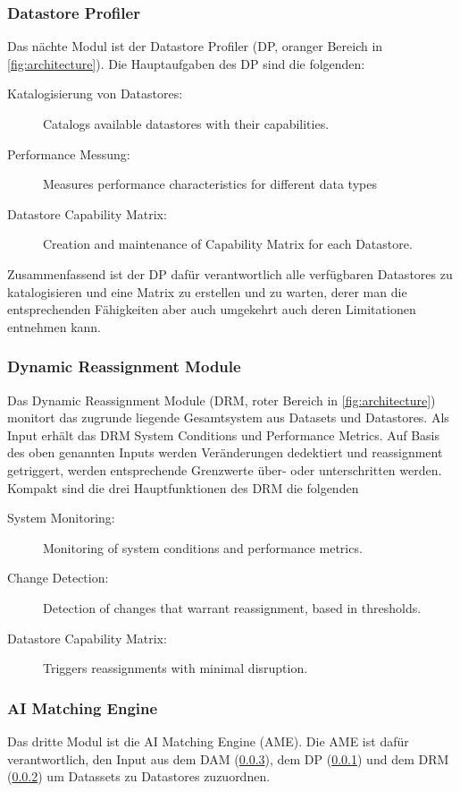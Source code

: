 \subsubsection{Datastore Profiler}
\label{ssubsec:main:init:system:dp}
Das nächte Modul ist der Datastore Profiler (DP, oranger Bereich in \ref{fig:architecture}). Die Hauptaufgaben des DP sind die folgenden:
\begin{description}
    \item[Katalogisierung von Datastores:] Catalogs available datastores with their capabilities.
    \item[Performance Messung:] Measures performance characteristics for different data types
    \item[Datastore Capability Matrix:] Creation and maintenance of Capability Matrix for each Datastore. 
\end{description}
Zusammenfassend ist der DP dafür verantwortlich alle verfügbaren Datastores zu katalogisieren und 
eine Matrix zu erstellen und zu warten, derer man die entsprechenden Fähigkeiten aber auch 
umgekehrt auch deren Limitationen entnehmen kann.

\subsubsection{Dynamic Reassignment Module}
\label{ssubsec:main:init:system:drm}

Das Dynamic Reassignment Module (DRM, roter Bereich in \ref{fig:architecture}) monitort das zugrunde liegende Gesamtsystem 
aus Datasets und Datastores.
Als Input erhält das DRM System Conditions und Performance Metrics.
Auf Basis des oben genannten Inputs werden Veränderungen dedektiert und reassignment getriggert, werden entsprechende
Grenzwerte über- oder unterschritten werden. 
Kompakt sind die drei Hauptfunktionen des DRM die folgenden
\begin{description}
    \item[System Monitoring:] Monitoring of system conditions and performance metrics.
    \item[Change Detection:] Detection of changes that warrant reassignment, based in thresholds.
    \item[Datastore Capability Matrix:] Triggers reassignments with minimal disruption. 
\end{description}

\subsubsection{AI Matching Engine}
\label{ssubsec:main:init:system:ame}
Das dritte Modul ist die AI Matching Engine (AME). Die AME ist dafür verantwortlich, 
den Input aus dem DAM (\ref{ssubsec:main:init:system:ame}), dem DP (\ref{ssubsec:main:init:system:dp})
und dem DRM (\ref{ssubsec:main:init:system:drm}) um Datassets zu Datastores zuzuordnen.

